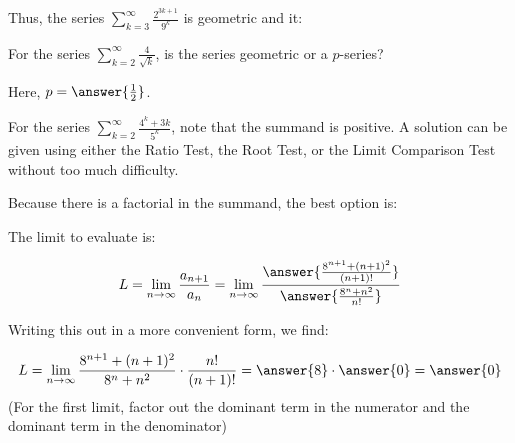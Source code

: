 \documentclass{ximera}
\begin{document}
\begin{exercise}
\begin{hint}
\begin{question}
Thus, the series $\sum_{k=3}^{\infty} \frac{2^{3k+1}}{9^k}$ is geometric and it:

\begin{multipleChoice}
\end{multipleChoice}
\end{question}

\begin{question}
For the series $\sum_{k=2}^{\infty} \frac{4}{\sqrt{k}}$, is the series geometric or a $p$-series?

\begin{multipleChoice}
\end{multipleChoice}

Here, $p= \answer{\frac{1}{2}}$. 
\end{question}




\begin{question}
For the series $\sum_{k=2}^{\infty} \frac{4^k+3k}{5^k}$, note that the summand is positive.  A solution can be given using either the Ratio Test, the Root Test, or the Limit Comparison Test without too much difficulty.

\end{question}


\begin{question}

Because there is a factorial in the summand, the best option is:

\begin{multipleChoice}
\end{multipleChoice}

The limit to evaluate is:

\[
L = \lim_{n \to \infty} \frac{a_{n+1}}{a_n} = \lim_{n \to \infty} \frac{\answer{ \frac{8^{n+1}+(n+1)^2}{(n+1)!}}}{\answer{ \frac{8^n+n^2}{n!}}}
\]

\begin{question}
Writing this out in a more convenient form, we find:

\[
L = \lim_{n \to \infty} \frac{8^{n+1}+(n+1)^2}{8^n+n^2} \cdot \frac{n!}{(n+1)!} = \answer{8} \cdot \answer{0} = \answer{0}
\]
(For the first limit, factor out the dominant term in the numerator and the dominant term in the denominator)


\end{question}
\end{question}
\end{hint}
\end{exercise}
\end{document}
